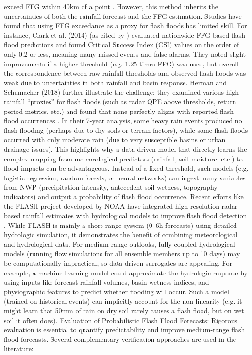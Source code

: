 exceed FFG within 40km of a point \citep{Herman2018}. However, this method inherits the uncertainties of both the rainfall forecast and the FFG estimation. Studies have found that using FFG exceedance as a proxy for flash floods has limited skill. For instance, Clark et al. (2014) (as cited by \citealt{Herman2018}) evaluated nationwide FFG-based flash flood predictions and found Critical Success Index (CSI) values on the order of only 0.2 or less, meaning many missed events and false alarms. They noted slight improvements if a higher threshold (e.g. 1.25 times FFG) was used, but overall the correspondence between raw rainfall thresholds and observed flash floods was weak due to uncertainties in both rainfall and basin response. Herman and Schumacher (2018) further illustrate the challenge: they examined various high-rainfall “proxies” for flash floods (such as radar QPE above thresholds, return period metrics, etc.) and found that none perfectly aligns with reported flash flood occurrences \citep{Herman2018}. In their 7-year analysis, some heavy rain events produced no flash flooding (perhaps due to dry soils or terrain factors), while some flash floods occurred with only moderate rain (due to very susceptible basins or urban drainage issues). This highlights why a data-driven model that directly learns the complex mapping from meteorological predictors (rainfall, soil moisture, etc.) to flood impacts can be advantageous. Instead of a fixed threshold, such models (e.g. logistic regression, random forests, or neural networks) can ingest many variables from NWP (precipitation intensity, antecedent soil wetness, topography indicators) and output a probability of flash flood occurrence. Recent efforts like the FLASH project developed by NOAA have integrated high-resolution radar-based rainfall estimates with hydrological models to improve flash flood detection \citep{Gourley2017}. While FLASH is mainly a short-range system (0–6h forecasts) using detailed hydrologic simulation, it demonstrates the benefit of combining meteorological and hydrological data. For medium-range outlooks, fully coupled hydrological models (running flow simulations for all ensemble members up to 10 days) may be computationally impractical, so data-driven surrogates are appealing. For example, a machine learning model could approximate the hydrologic response by using inputs like forecast rainfall volumes, basin wetness indices, and physiographic features to predict whether flooding will occur. Such a model (trained on historical events) can implicitly account for the non-linearity (e.g. it might learn that 50mm of rain on dry soil rarely causes a flash flood, but on wet soil it often does). Evaluation of Probabilistic Flash Flood Forecasts: Rigorous evaluation is essential to quantify predictability and improve medium-range flash flood forecasts. Several complementary verification approaches are used in the literature:
